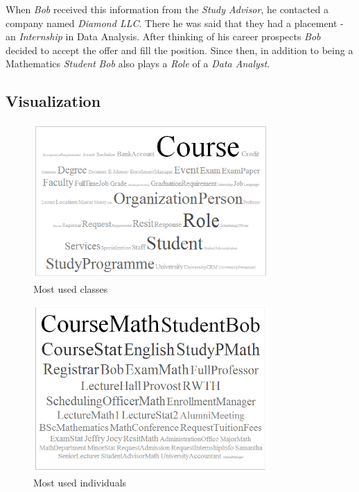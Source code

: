 \documentclass{article}    %
\begin{document}
When \textit{Bob} received this information from the \textit{Study Advisor}, he contacted a company named \textit{Diamond LLC}. There he was said that they had a placement - an \textit{Internship} in Data Analysis. After thinking of his career prospects \textit{Bob} decided to accept the offer and fill the position. Since then, in addition to being a Mathematics \textit{Student} \textit{Bob} also plays a \textit{Role} of a \textit{Data Analyst}.
% 
\subsection{Visualization}
%
\begin{figure}[htbp]
  \centering
    \includegraphics[width=0.8\textwidth]{Materials/Figures/classUsageCloud.png}
    \caption{Most used classes}
  \label{classUsage}
\end{figure}

\begin{figure}[htbp]
  \centering
    \includegraphics[width=0.8\textwidth]{Materials/Figures/cloudIndies.png}
    \caption{Most used individuals}
  \label{cloudIndi}
\end{figure}
\end{document}
